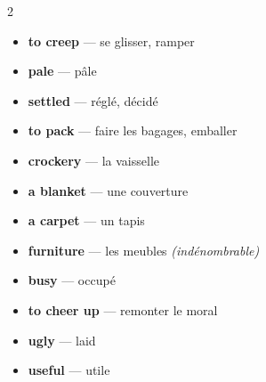 \documentclass[troisieme]{fiche}
\begin{document}
\begin{multicols}{2}\small
\begin{itemize}[label=--,itemsep=0.8mm,leftmargin=*]
  \item \textbf{to creep} — se glisser, ramper
  \item \textbf{pale} — pâle
  \item \textbf{settled} — réglé, décidé
  \item \textbf{to pack} — faire les bagages, emballer
  \item \textbf{crockery} — la vaisselle
  \item \textbf{a blanket} — une couverture
  \item \textbf{a carpet} — un tapis
  \item \textbf{furniture} — les meubles \textit{(indénombrable)}
  \item \textbf{busy} — occupé
  \item \textbf{to cheer up} — remonter le moral
  \item \textbf{ugly} — laid
  \item \textbf{useful} — utile
\end{itemize}
\end{multicols}
\end{document}
